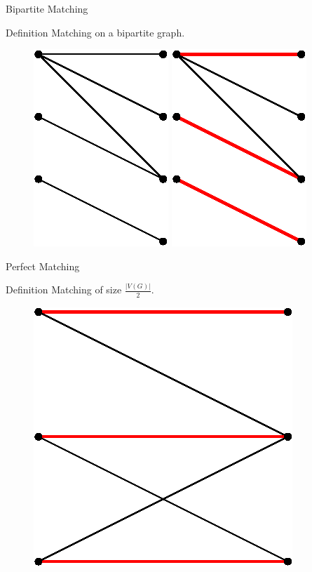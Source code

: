 \begin{frame}[t]{Bipartite Matching}
  \begin{block}{Definition}
  	Matching on a bipartite graph.
  \end{block} 
	
  \vspace{1em}
  \begin{figure}
	\centering
	\includegraphics[width=.25\linewidth]{img/introduction/bipar.eps}
	\hspace{3em}	
	\includegraphics[width=.25\linewidth]{img/introduction/biparmatch.eps}
  \end{figure}
\end{frame}

\begin{frame}[t]{Perfect Matching}
	\begin{block}{Definition}
	  Matching of size $\frac{|V\left(G\right)|}{2}$.
	\end{block} 
	
	\vspace{1em}
	\begin{figure}
	  \centering
	  \includegraphics[width=0.3\linewidth]{img/introduction/perfectmatching.eps}
	\end{figure}	
\end{frame}

